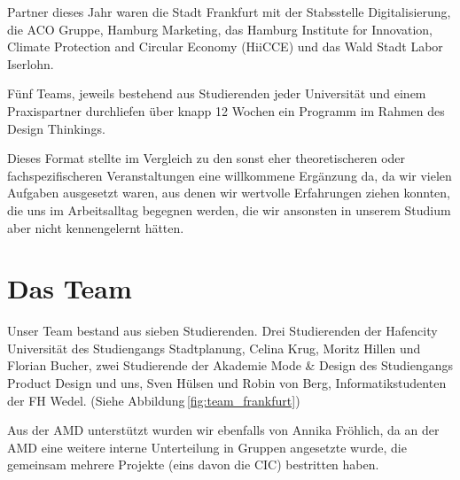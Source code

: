     Partner dieses Jahr waren die Stadt Frankfurt mit der Stabsstelle Digitalisierung, die ACO Gruppe, Hamburg Marketing, das Hamburg Institute for Innovation, Climate Protection and Circular Economy (HiiCCE) und das Wald Stadt Labor Iserlohn.

    Fünf Teams, jeweils bestehend aus Studierenden jeder Universität und einem Praxispartner durchliefen über knapp 12 Wochen ein Programm im Rahmen des Design Thinkings.

    Dieses Format stellte im Vergleich zu den sonst eher theoretischeren oder fachspezifischeren Veranstaltungen eine willkommene Ergänzung da, da wir vielen Aufgaben ausgesetzt waren, aus denen wir wertvolle Erfahrungen ziehen konnten, die uns im Arbeitsalltag begegnen werden, die wir ansonsten in unserem Studium aber nicht kennengelernt hätten.

\section{Das Team}

        Unser Team bestand aus sieben Studierenden. Drei Studierenden der Hafencity Universität des Studiengangs Stadtplanung, Celina Krug, Moritz Hillen und Florian Bucher, zwei Studierende der Akademie Mode \& Design des Studiengangs Product Design und uns, Sven Hülsen und Robin von Berg, Informatikstudenten der FH Wedel. (Siehe Abbildung\,\ref{fig:team_frankfurt})

        Aus der AMD unterstützt wurden wir ebenfalls von Annika Fröhlich, da an der AMD eine weitere interne Unterteilung in Gruppen angesetzte wurde, die gemeinsam mehrere Projekte (eins davon die CIC) bestritten haben.

